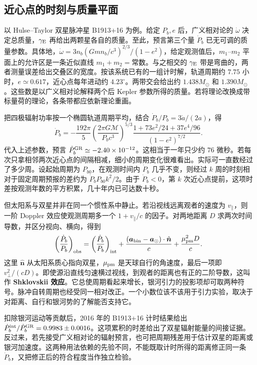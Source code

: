 \subsection{近心点的时刻与质量平面}

以 Hulse--Taylor 双星脉冲星 B1913+16 为例。给定 $P_b,e$ 后，广义相对论的 $\dot\omega$ 决定总质量，$\gamma_{\rm E}$ 再给出两颗星各自的质量。至此，预言第三个量 $\dot P_b$ 已无可调的质量参数。具体地，$\dot\omega=3n_b(Gmn_b/c^3)^{2/3}/(1-e^2)$，给定观测值后，$m_1$--$m_2$ 平面上的允许区是一条近似直线 $m_1+m_2=\text{常数}$。与之相交的 $\gamma_{\rm E}$ 带是弯曲的，两者测量误差给出交叠区的宽度。按该系统已有的一组计时解，轨道周期约 $7.75$ 小时，$e\simeq0.617$，近心点每年进动约 $4.23^\circ$。两带交会给出约 $1.438M_\odot$ 和 $1.390M_\odot$。这些数是以广义相对论解释两个后 Kepler 参数所得的质量。若将理论改换成带标量荷的理论，各条带都应依新理论重画。

把四极辐射功率按一个椭圆轨道周期平均，结合 $\dot P_b/P_b=3\dot a/(2a)$，得
\[
    \dot P_b=-\frac{192\pi}{5}
    \left(\frac{2\pi G\mathcal M}{P_bc^3}\right)^{5/3}
    \frac{1+73e^2/24+37e^4/96}{(1-e^2)^{7/2}} .
\]
代入上述参数，预言 $\dot P_b^{\rm GR}\simeq-2.40\times10^{-12}$。这相当于一年只少约 $76$ 微秒。若每次只拿相邻两次近心点的间隔相减，细小的周期变化很难看出。实际可一直数经过了多少周。设起始周期为 $P_{b0}$，在观测时间内 $\dot P_b$ 几乎不变，则经过 $k$ 周的时刻相对于固定周期预报的差约为 $\dot P_bP_{b0}k^2/2$。由于 $\dot P_b<0$，第 $k$ 次近心点提前，这项时差按观测年数的平方积累，几十年内已可达数十秒。

但太阳系与双星并非在同一个惯性系中静止。若沿视线远离观者的速度为 $v_\parallel$，则一阶 Doppler 效应使观测周期多一个 $1+v_\parallel/c$ 的因子。对两地距离 $D$ 求两次时间导数，并区分视向、横向，得到
\[
 \left(\frac{\dot P_b}{P_b}\right)_{\rm obs}
 =
 \left(\frac{\dot P_b}{P_b}\right)_{\rm int}
 +\frac{(\bm a_{\rm bin}-\bm a_\odot)\cdot\hat{\bm n}}{c}
 +\frac{\mu_{\rm pm}^2D}{c}.
\]
这里 $\hat{\bm n}$ 从太阳系质心指向双星，$\mu_{\rm pm}$ 是天球自行的角速度，最后一项即 $v_\perp^2/(cD)$。即使源沿直线匀速横过视线，到观者的距离也有正的二阶导数，这叫作 \textbf{Shklovskii 效应}。它总使周期看起来增长，银河引力的投影项却可取两种符号。脉冲自转周期也经受同一相对改正。一个小数位该不该用于引力实验，取决于对距离、自行和银河势的了解能否支持它。

扣除银河运动等贡献后，2016 年的 B1913+16 计时结果给出 $\dot P_b^{\rm int}/\dot P_b^{\rm GR}=0.9983\pm0.0016$。这项累积的时差给出了双星辐射能量的间接证据。反过来，若先接受广义相对论的辐射预言，也可把周期残差用于估计双星的距离或银河加速度。这两种用法依赖的先验不同，不能既取计时所得的距离修正同一条 $\dot P_b$，又把修正后的符合程度当作独立检验。

